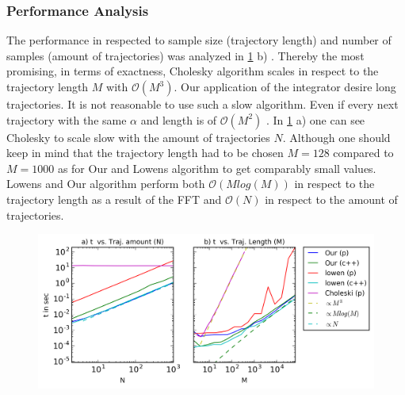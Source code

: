 \documentclass[
  a4paper,BCOR10mm,oneside,
  bibtotoc,idxtotoc,
  headsepline,footsepline,%
  fleqn,openbib
]{scrbook}
\begin{document}
\subsubsection{Performance Analysis}
The performance in respected to sample size (trajectory length) and number of samples (amount of trajectories) was analyzed in \cref{fig:200} b) . Thereby the most promising, in terms of exactness, Cholesky algorithm scales in respect to the trajectory length $M$ with $\mathcal{O}(M^3)$. Our application of the integrator desire long trajectories. It is not reasonable to use such a slow algorithm. Even if every next trajectory with the same $\alpha$ and length is of  $\mathcal{O}(M^2)$ \cite{Dieker2004}. In \cref{fig:200} a) one can see Cholesky to scale slow with the amount of trajectories $N$. Although one should keep in mind that the trajectory length had to be chosen $M=128$ compared to $M=1000$ as for Our and Lowens algorithm to get comparably small values. Lowens and Our algorithm perform both $\mathcal{O}(M log(M))$ in respect to the trajectory length as a result of the FFT and $\mathcal{O}(N)$ in respect to the amount of trajectories.
\begin{figure}[h!]
  \centering
  \includegraphics[width=\linewidth]{./data/profilingneu1.png}
  \captionsetup{width=0.9\linewidth}
  \label{fig:200}
\end{figure}
\end{document}
